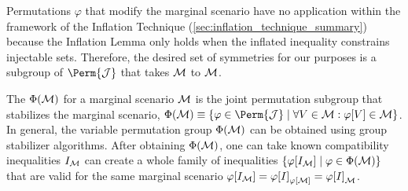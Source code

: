 \documentclass[aps, 10pt, english, twoside, pra, nofootinbib, tightenlines, longbibliography, superscriptaddress]{revtex4-1}
\begin{document}
    Permutations $\varphi$ that modify the marginal scenario have no application within the framework of the Inflation Technique (\cref{sec:inflation_technique_summary}) because the Inflation Lemma only holds when the inflated inequality constrains injectable sets. Therefore, the desired set of symmetries for our purposes is a subgroup of $\Perm{\jointvar}$ that takes $\mathcal{M}$ to $\mathcal{M}$.

    The  $\gp\br{\mscenario}$ for a marginal scenario $\mathcal{M}$ is the joint permutation subgroup that stabilizes the marginal scenario, $\Phi\br{\mscenario} \defined \bc{\varphi \in \Perm{\jointvar} \mid \forall V \in \mscenario : \varphi\bs{V} \in \mscenario}$.
    In general, the variable permutation group $\gp\br{\mscenario}$ can be obtained using group stabilizer algorithms. After obtaining $\gp\br{\mscenario}$, one can take known compatibility inequalities $I_{\mathcal{M}}$ can create a whole family of inequalities $\bc{\varphi\bs{I_{\mscenario}} \mid \varphi \in \gp\br{\mscenario}}$ that are valid for the same marginal scenario $\varphi\bs{I_{\mscenario}} = \varphi\bs{I}_{\varphi\bs{\mscenario}} = \varphi\bs{I}_{\mscenario}$.
\end{document}
